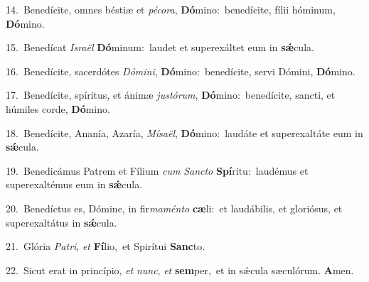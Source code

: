 {\numbfont\textcolor{\numbcolor}{14.}}~Benedícite, omnes béstiæ et \textit{pé}\-\textit{co}\textit{ra}, \textbf{Dó}\-mino:~\star benedícite, fílii hóminum, \textbf{Dó}\-mino.\par
{\numbfont\textcolor{\numbcolor}{15.}}~Benedícat \textit{Is}\-\textit{ra}\textit{ël} \textbf{Dó}\-minum:~\star laudet et superexáltet eum in \textbf{sǽ}\-cula.\par
{\numbfont\textcolor{\numbcolor}{16.}}~Benedícite, sacerdótes \textit{Dó}\-\textit{mi}\textit{ni}, \textbf{Dó}\-mino:~\star benedícite, servi Dómini, \textbf{Dó}\-mino.\par
{\numbfont\textcolor{\numbcolor}{17.}}~Benedícite, spíritus, et ánimæ \textit{jus}\-\textit{tó}\textit{rum}, \textbf{Dó}\-mino:~\star benedícite, sancti, et húmiles corde, \textbf{Dó}\-mino.\par
{\numbfont\textcolor{\numbcolor}{18.}}~Benedícite, Ananía, Azaría, \textit{Mí}\-\textit{sa}\textit{ël}, \textbf{Dó}\-mino:~\star laudáte et superexaltáte eum in \textbf{sǽ}\-cula.\par
{\numbfont\textcolor{\numbcolor}{19.}}~Benedicámus Patrem et Fílium \textit{cum} \textit{Sanc}\-\textit{to} \textbf{Spí}\-ritu:~\star laudémus et superexaltémus eum in \textbf{sǽ}\-cula.\par
{\numbfont\textcolor{\numbcolor}{20.}}~Benedíctus es, Dómine, in fir\-\textit{ma}\-\textit{mén}\textit{to} \textbf{cæ}\-li:~\star et laudábilis, et gloriósus, et superexaltátus in \textbf{sǽ}\-cula.\par
{\numbfont\textcolor{\numbcolor}{21.}}~Glória \textit{Pa}\-\textit{tri}, \textit{et} \textbf{Fí}\-lio,~\star et Spirítui \textbf{Sanc}\-to.\par
{\numbfont\textcolor{\numbcolor}{22.}}~Sicut erat in princípio, \textit{et} \textit{nunc}\-, \textit{et} \textbf{sem}\-per,~\star et in sǽcula sæculórum. \textbf{A}\-men.\par
